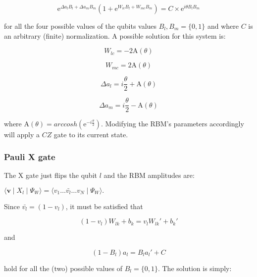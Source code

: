\begin{equation}
   \mathrm{e}^{\Delta a_{l} B_{l} + \Delta a_{m} B_{m}}(1 + \mathrm{e}^{W_{lc} B_{l} + W_{mc} B_{m}}) = C \times \mathrm{e}^{i \theta B_{l} B_{m}}
\end{equation}

for all the four possible values of the qubits values $B_{l}, B_{m} = \{0,1\}$ and where $C$ is an arbitrary (finite)
normalization. A possible solution for this system is:

\begin{equation}
   W_{lc} = -2\mathrm{A}(\theta) 
\end{equation}

\begin{equation}
   W_{mc} = 2\mathrm{A}(\theta) 
\end{equation}

\begin{equation}
   \Delta a_{l} = i \frac{\theta}{2} + \mathrm{A}(\theta)
\end{equation}

\begin{equation}
   \Delta a_{m} = i \frac{\theta}{2} - \mathrm{A}(\theta)
\end{equation}

where $\mathrm{A}(\theta) = arccosh(\mathrm{e}^{-i \frac{\theta}{2}})$. Modifying the RBM's parameters 
accordingly will apply a $CZ$ gate to its current state.

\subsubsection{Pauli X gate}
The X gate just flips the qubit $l$ and the RBM amplitudes are:

$
    \langle \bm{v} \mid X_{l} \mid \Psi_{W}  \rangle = 
    \langle v_{1} \dots \bar{v_{l}} \dots v_{N} \mid \Psi_{W} \rangle.
$

Since $\bar{v_{l}} = (1-v_{l})$, it must be satisfied that

\begin{equation}
    (1-v_{l})W_{lk} + b_{k} = v_{l} W_{lk}\prime + b_{k}\prime
\end{equation}

and

\begin{equation}
   (1-B_{l}) a_{l} = B_{l} a_{l}\prime + C 
\end{equation}

hold for all the (two) possible values of $B_{l} = \{0,1\}$. The solution is simply:

